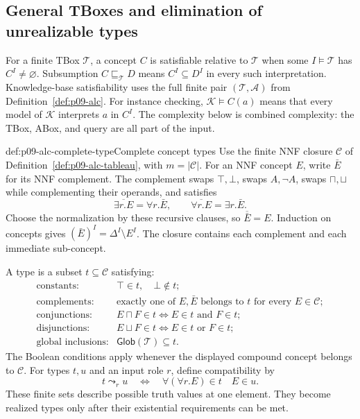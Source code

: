 
\subsection{General TBoxes and elimination of unrealizable types}
\label{sec:p09-alc-general-tboxes}

For a finite TBox \(\mathcal T\), a concept \(C\) is satisfiable
relative to \(\mathcal T\) when some \(I\models\mathcal T\) has
\(C^I\ne\varnothing\).
Subsumption \(C\sqsubseteq_{\mathcal T}D\) means
\(C^I\subseteq D^I\) in every such interpretation.
Knowledge-base satisfiability uses the full finite pair
\((\mathcal T,\mathcal A)\) from Definition~\ref{def:p09-alc}.
For instance checking, \(\mathcal K\models C(a)\) means that every
model of \(\mathcal K\) interprets \(a\) in \(C^I\).
The complexity below is combined complexity: the TBox, ABox, and
query are all part of the input.

\begin{hbdefinition}{def:p09-alc-complete-type}{Complete concept types}
Use the finite NNF closure \(\mathcal C\) of
Definition~\ref{def:p09-alc-tableau}, with \(m=|\mathcal C|\).
For an NNF concept \(E\), write \(\bar E\) for its NNF complement.
The complement swaps \(\top,\bot\), swaps \(A,\neg A\), swaps
\(\sqcap,\sqcup\) while complementing their operands, and satisfies
\[
 \overline{\exists r.E}=\forall r.\bar E,\qquad
 \overline{\forall r.E}=\exists r.\bar E.
\]
Choose the normalization by these recursive clauses, so
\(\overline{\bar E}=E\).
Induction on concepts gives
\((\bar E)^I=\Delta^I\setminus E^I\).
The closure contains each complement and each immediate sub-concept.

A type is a subset \(t\subseteq\mathcal C\) satisfying:
\[
\begin{array}{ll}
 \text{constants:}&\top\in t,\quad\bot\notin t;\\
 \text{complements:}&\text{exactly one of }E,\bar E\text{ belongs to }t
                         \text{ for every }E\in\mathcal C;\\
 \text{conjunctions:}&E\sqcap F\in t
                         \Longleftrightarrow E\in t\text{ and }F\in t;\\
 \text{disjunctions:}&E\sqcup F\in t
                         \Longleftrightarrow E\in t\text{ or }F\in t;\\
 \text{global inclusions:}&\mathsf{Glob}(\mathcal T)\subseteq t.
\end{array}
\]
The Boolean conditions apply whenever the displayed compound concept
belongs to \(\mathcal C\).
For types \(t,u\) and an input role \(r\), define compatibility by
\[
 t\leadsto_r u
 \quad\Longleftrightarrow\quad
 \forall(\forall r.E)\in t\quad E\in u.
\]
These finite sets describe possible truth values at one element.
They become realized types only after their existential requirements
can be met.
\end{hbdefinition}

